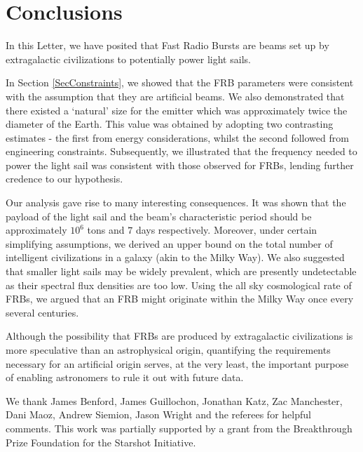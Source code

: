 \documentclass[twocolumn,tighten]{aastex61}
\begin{document}
\section{Conclusions} \label{SecConc}
In this Letter, we have posited that Fast Radio Bursts are beams set up by extragalactic civilizations to potentially power light sails. 

In Section \ref{SecConstraints}, we showed that the FRB parameters were consistent with the assumption that they are artificial beams. We also demonstrated that there existed a `natural' size for the emitter which was approximately twice the diameter of the Earth. This value was obtained by adopting two contrasting estimates - the first from energy considerations, whilst the second followed from engineering constraints. Subsequently, we illustrated that the frequency needed to power the light sail was consistent with those observed for FRBs, lending further credence to our hypothesis.

Our analysis gave rise to many interesting consequences. It was shown that the payload of the light sail and the beam's characteristic period should be approximately $10^{6}$ tons and $7$ days respectively. Moreover, under certain simplifying assumptions, we derived an upper bound on the total number of intelligent civilizations in a galaxy (akin to the Milky Way). We also suggested that smaller light sails may be widely prevalent, which are presently undetectable as their spectral flux densities are too low. Using the all sky cosmological rate of FRBs, we argued that an FRB might originate within the Milky Way once every several centuries.

Although the possibility that FRBs are produced by extragalactic civilizations is more speculative than an astrophysical origin, quantifying the requirements necessary for an artificial origin serves, at the very least, the important purpose of enabling astronomers to rule it out with future data.

\acknowledgments
We thank James Benford, James Guillochon, Jonathan Katz, Zac Manchester, Dani Maoz, Andrew Siemion, Jason Wright and the referees for helpful comments. This work was partially supported by a grant from the Breakthrough Prize Foundation for the Starshot Initiative.

%
%
\end{document}
